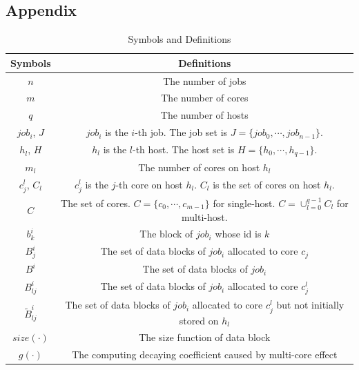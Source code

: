 \documentclass{llncs}
\begin{document}

%
%
%
%
% 
%

\begin{appendices}
\section*{Appendix}

\begin{table}[htbp]
\caption{Symbols and Definitions}
\begin{center}
\begin{tabular}{c|c}
\toprule
\textbf{Symbols} &\textbf{Definitions}  \\
\midrule
$n$ & The number of jobs  \\ 
$m$ & The number of cores \\
$q$ & The number of hosts  \\ 
$job_i$, $J$ & $job_i$ is the $i$-th job. The job set is $J=\{job_0, \cdots, job_{n-1}\}$. \\ 
$h_l$, $H$ & $h_l$ is the $l$-th  host. The host set is $H=\{h_0, \cdots, h_{q-1}\}$. \\ 
$m_l$ & The number of cores on host $h_l$\\
$c^l_j$, $C_l$ & $c^l_j$ is the $j$-th core on host $h_l$. $C_l$ is the set of cores on host $h_l$.\\ 
$C$ & The set of cores. $C=\{c_0,\cdots,c_{m-1}\}$ for single-host. $C=\cup_{l=0}^{q-1} C_l$ for multi-host.\\
$b^i_k$& The block of $job_i$ whose id is $k$\\
$B^i_{j}$ & The set of data blocks of $job_i$ allocated to core $c_j$ \\
$B^i$ & The set of data blocks of $job_i$ \\ 
$B^i_{lj}$ & The set of data blocks of $job_i$ allocated to core $c^l_j$ \\
$\widetilde{B}^i_{lj}$ & The set of data blocks of $job_i$ allocated to core $c^l_j$ but not initially stored on $h_l$\\
$size(\cdot)$ & The size function of data block\\
$g(\cdot)$ &  The computing decaying coefficient caused by multi-core effect\\

\end{tabular}
\end{center}
\end{table}
\end{appendices}
\end{document}
